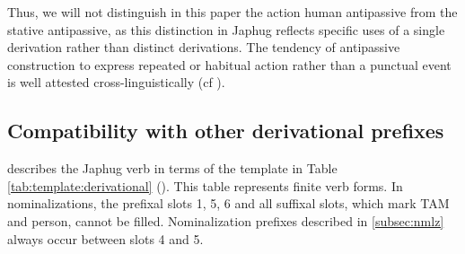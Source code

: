 \documentclass[oldfontcommands,oneside,a4paper,11pt]{article}
\begin{document}
Thus, we will not distinguish in this paper the action human antipassive from the stative antipassive, as this distinction in Japhug reflects specific uses of a single derivation rather than distinct derivations. The tendency of antipassive construction to express repeated or habitual action rather than a punctual event
is well attested cross-linguistically (cf \citealt[91-2]{cooreman94antipassive}).


\subsection{Compatibility with other derivational prefixes} \label{subsec:compatibility}

\citealt{jacques12incorp} describes the Japhug verb  in terms of    the template in Table \ref{tab:template:derivational} (\citealt{jacques12incorp}). This table represents finite verb forms. In nominalizations, the prefixal slots 1, 5, 6 and all suffixal slots, which mark TAM and person, cannot be filled. Nominalization prefixes described in \ref{subsec:nmlz} always occur between slots 4 and 5.
\end{document}
